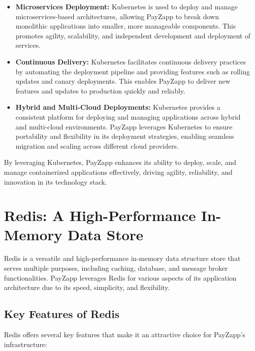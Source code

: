 \documentclass[12pt,a4paper]{report}
\begin{document}
\begin{itemize}
    \item \textbf{Microservices Deployment:} Kubernetes is used to deploy and manage microservices-based architectures, allowing PayZapp to break down monolithic applications into smaller, more manageable components. This promotes agility, scalability, and independent development and deployment of services.
    
    \item \textbf{Continuous Delivery:} Kubernetes facilitates continuous delivery practices by automating the deployment pipeline and providing features such as rolling updates and canary deployments. This enables PayZapp to deliver new features and updates to production quickly and reliably.
    
    \item \textbf{Hybrid and Multi-Cloud Deployments:} Kubernetes provides a consistent platform for deploying and managing applications across hybrid and multi-cloud environments. PayZapp leverages Kubernetes to ensure portability and flexibility in its deployment strategies, enabling seamless migration and scaling across different cloud providers.
\end{itemize}

By leveraging Kubernetes, PayZapp enhances its ability to deploy, scale, and manage containerized applications effectively, driving agility, reliability, and innovation in its technology stack.

\section{Redis: A High-Performance In-Memory Data Store}

Redis is a versatile and high-performance in-memory data structure store that serves multiple purposes, including caching, database, and message broker functionalities. PayZapp leverages Redis for various aspects of its application architecture due to its speed, simplicity, and flexibility.

\subsection{Key Features of Redis}

Redis offers several key features that make it an attractive choice for PayZapp's infrastructure:
\end{document}
